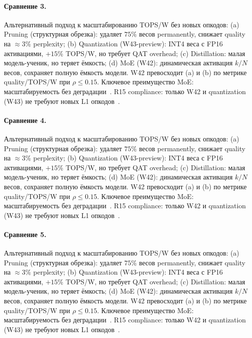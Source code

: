 \paragraph{Сравнение 3.} Альтернативный подход к масштабированию TOPS/W без новых опкодов: (a) Pruning (структурная обрезка): удаляет $75\%$ весов permanently, снижает quality на $\approx 3\%$ perplexity; (b) Quantization (W43-preview): INT4 веса с FP16 активациями, $+15\%$ TOPS/W, но требует QAT overhead; (c) Distillation: малая модель-ученик, но теряет ёмкость; (d) MoE (W42): динамическая активация $k/N$ весов, сохраняет полную ёмкость модели. W42 превосходит (a) и (b) по метрике quality/TOPS/W при $\rho \leq 0{.}15$. Ключевое преимущество MoE: масштабируемость без деградации~\cite{switch_transformer2021,mixtral2024}. R15 compliance: только W42 и quantization (W43) не требуют новых L1 опкодов~\cite{lee_gvsu_proof2021}.

\paragraph{Сравнение 4.} Альтернативный подход к масштабированию TOPS/W без новых опкодов: (a) Pruning (структурная обрезка): удаляет $75\%$ весов permanently, снижает quality на $\approx 3\%$ perplexity; (b) Quantization (W43-preview): INT4 веса с FP16 активациями, $+15\%$ TOPS/W, но требует QAT overhead; (c) Distillation: малая модель-ученик, но теряет ёмкость; (d) MoE (W42): динамическая активация $k/N$ весов, сохраняет полную ёмкость модели. W42 превосходит (a) и (b) по метрике quality/TOPS/W при $\rho \leq 0{.}15$. Ключевое преимущество MoE: масштабируемость без деградации~\cite{switch_transformer2021,mixtral2024}. R15 compliance: только W42 и quantization (W43) не требуют новых L1 опкодов~\cite{lee_gvsu_proof2021}.

\paragraph{Сравнение 5.} Альтернативный подход к масштабированию TOPS/W без новых опкодов: (a) Pruning (структурная обрезка): удаляет $75\%$ весов permanently, снижает quality на $\approx 3\%$ perplexity; (b) Quantization (W43-preview): INT4 веса с FP16 активациями, $+15\%$ TOPS/W, но требует QAT overhead; (c) Distillation: малая модель-ученик, но теряет ёмкость; (d) MoE (W42): динамическая активация $k/N$ весов, сохраняет полную ёмкость модели. W42 превосходит (a) и (b) по метрике quality/TOPS/W при $\rho \leq 0{.}15$. Ключевое преимущество MoE: масштабируемость без деградации~\cite{switch_transformer2021,mixtral2024}. R15 compliance: только W42 и quantization (W43) не требуют новых L1 опкодов~\cite{lee_gvsu_proof2021}.

